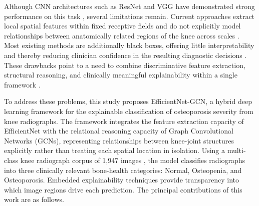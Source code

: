 \documentclass[journal]{IEEEtran}
\begin{document}
Although CNN architectures such as ResNet and VGG have demonstrated strong
performance on this task \cite{wani2023osteoporosis}, several limitations
remain. Current approaches extract local spatial features within fixed
receptive fields and do not explicitly model relationships between
anatomically related regions of the knee across scales \cite{mienye2025graph}.
Most existing methods are additionally black boxes, offering little
interpretability and thereby reducing clinician confidence in the resulting
diagnostic decisions \cite{salahuddin2022transparency}. These drawbacks point
to a need to combine discriminative feature extraction, structural reasoning,
and clinically meaningful explainability within a single framework
\cite{mienye2025graph,salahuddin2022transparency}.

To address these problems, this study proposes EfficientNet-GCN, a hybrid deep
learning framework for the explainable classification of osteoporosis severity
from knee radiographs. The framework integrates the feature extraction capacity
of EfficientNet with the relational reasoning capacity of Graph Convolutional
Networks (GCNs), representing relationships between knee-joint structures
explicitly rather than treating each spatial location in isolation. Using a
multi-class knee radiograph corpus of 1,947 images \cite{gobara2024multiclass},
the model classifies radiographs into three clinically relevant bone-health
categories: Normal, Osteopenia, and Osteoporosis. Embedded explainability
techniques provide transparency into which image regions drive each prediction.
The principal contributions of this work are as follows.
\end{document}
